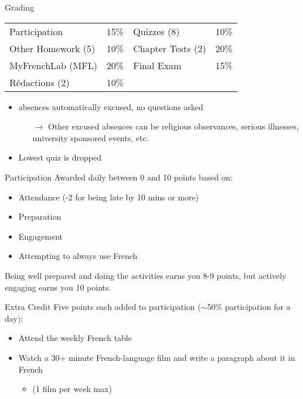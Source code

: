 \begin{frame}{Grading}
  \begin{center}
    \begin{tabular}{l l | l l}
      Participation      & 15\% & Quizzes (8)       & 10\% \\
      Other Homework (5) & 10\% & Chapter Tests (2) & 20\% \\
      MyFrenchLab (MFL)  & 20\% & Final Exam        & 15\% \\
      Rédactions (2)     & 10\% &                   &
    \end{tabular}
  \end{center}
  \begin{itemize}
    \item \absences{} absences automatically excused, no questions asked
    \begin{itemize}
      \item[$\to$] Other excused absences can be religious observances, serious illnesses, university sponsored events, etc.
    \end{itemize}
    \item Lowest quiz is dropped
  \end{itemize}
\end{frame}

\begin{frame}{Participation}
  Awarded daily between 0 and 10 points based on:
  \begin{itemize}
    \item Attendance (-2 for being late by 10 mins or more)
    \item Preparation
    \item Engagement
    \item Attempting to always use French
  \end{itemize}
  Being well prepared and doing the activities earns you 8-9 points, but \alert{actively} engaging earns you 10 points.
\end{frame}

\begin{frame}{Extra Credit}
  Five points each added to participation ($\sim$50\% participation for a day):
  \begin{itemize}
    \item Attend the weekly French table
    \item Watch a 30+ minute French-language film and write a paragraph about it \alert{in French}
    \begin{itemize}
      \item (1 film per week max)
    \end{itemize}
  \end{itemize}
\end{frame}

